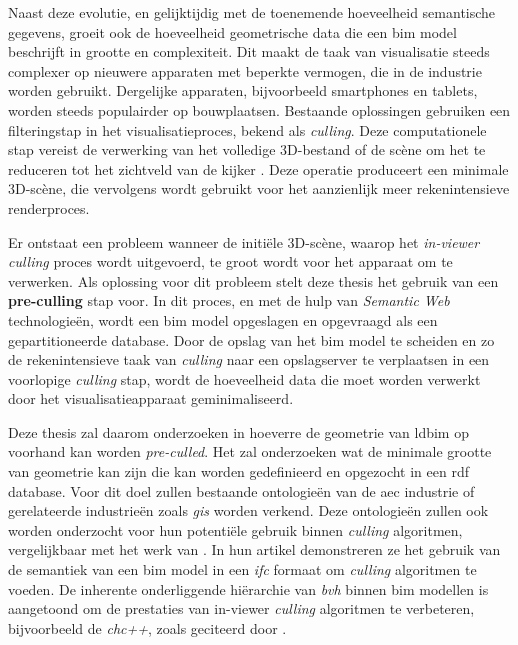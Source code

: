 \begin{refsection}
\begin{multicols}{2}
        Naast deze evolutie, en gelijktijdig met de toenemende hoeveelheid semantische gegevens, groeit ook de hoeveelheid geometrische data die een \ac{bim} model beschrijft in grootte en complexiteit. Dit maakt de taak van visualisatie steeds complexer op nieuwere apparaten met beperkte vermogen, die in de industrie worden gebruikt. Dergelijke apparaten, bijvoorbeeld smartphones en tablets, worden steeds populairder op bouwplaatsen. Bestaande oplossingen gebruiken een filteringstap in het visualisatieproces, bekend als \emph{culling}. Deze computationele stap vereist de verwerking van het volledige 3D-bestand of de scène om het te reduceren tot het zichtveld van de kijker \parencite{Johansson2015}. Deze operatie produceert een minimale 3D-scène, die vervolgens wordt gebruikt voor het aanzienlijk meer rekenintensieve renderproces.

        Er ontstaat een probleem wanneer de initiële 3D-scène, waarop het \emph{in-viewer culling} proces wordt uitgevoerd, te groot wordt voor het apparaat om te verwerken. Als oplossing voor dit probleem stelt deze thesis het gebruik van een \textbf{pre-culling} stap voor. In dit proces, en met de hulp van \emph{Semantic Web} technologieën, wordt een \ac{bim} model opgeslagen en opgevraagd als een gepartitioneerde database. Door de opslag van het \ac{bim} model te scheiden en zo de rekenintensieve taak van \emph{culling} naar een opslagserver te verplaatsen in een voorlopige \emph{culling} stap, wordt de hoeveelheid data die moet worden verwerkt door het visualisatieapparaat geminimaliseerd.

        Deze thesis zal daarom onderzoeken in hoeverre de geometrie van \ac{ldbim} op voorhand kan worden \emph{pre-culled}. Het zal onderzoeken wat de minimale grootte van geometrie kan zijn die kan worden gedefinieerd en opgezocht in een \ac{rdf} database. Voor dit doel zullen bestaande ontologieën van de \ac{aec} industrie of gerelateerde industrieën zoals \emph{\ac{gis}} worden verkend. Deze ontologieën zullen ook worden onderzocht voor hun potentiële gebruik binnen \emph{culling} algoritmen, vergelijkbaar met het werk van \cite{Johansson2009}. In hun artikel demonstreren ze het gebruik van de semantiek van een \ac{bim} model in een \emph{\ac{ifc}} formaat om \emph{culling} algoritmen te voeden. De inherente onderliggende hiërarchie van \emph{\ac{bvh}} binnen \ac{bim} modellen is aangetoond om de prestaties van in-viewer \emph{culling} algoritmen te verbeteren, bijvoorbeeld de \emph{\ac{chc}++}, zoals geciteerd door \parencite{Johansson2015}.


\end{multicols}
\end{refsection}
